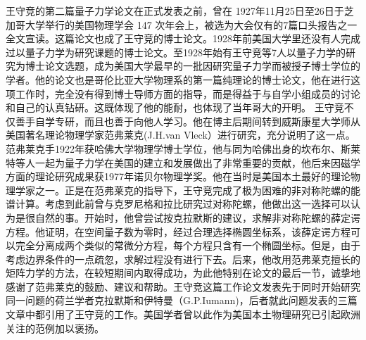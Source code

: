 王守竞的第二篇量子力学论文在正式发表之前，曾在 1927年11月25日至26日于芝加哥大学举行的美国物理学会 147 次年会上，被选为大会仅有的7篇口头报告之一全文宣读。这篇论文也成了王守竞的博士论文。1928年前美国大学里还没有人完成过以量子力学为研究课题的博士论文。至1928年始有王守竞等7人以量子力学的研究为博士论文选题，成为美国大学最早的一批因研究量子力学而被授子博士学位的学者。他的论文也是哥伦比亚大学物理系的第一篇纯理论的博士论文，他在进行这项工作时，完全没有得到博士导师方面的指导，而是得益于与自学小组成员的讨论和自己的认真钻研。这既体现了他的能耐，也体现了当年哥大的开明。
王守竞不仅善手自学专研，而且也善于向他人学习。他在博主后期间转到威斯康星大学师从美国著名理论物理学家范弗莱克(J.H.van Vleck）进行研究，充分说明了这一点。范弗莱克手1922年获哈佛大学物理学博士学位，他与同为哈佛出身的坎布尔、斯莱特等人一起为量子力学在美国的建立和发展做出了非常重要的贡献，他后来因磁学方面的理论研究成果获1977年诺贝尔物理学奖。他在当时是美国本土最好的理论物理学家之一。正是在范弗莱克的指导下，王守竞完成了极为困难的非对称陀螺的能谱计算。考虑到此前曾与克罗尼格和拉比研究过对称陀螺，他做出这一选择可以认为是很自然的事。开始时，他曾尝试按克拉默斯的建议，求解非对称陀螺的薛定谔方程。他证明，在空间量子数为零时，经过合理选择椭圆坐标系，该薛定谔方程可以完全分离成两个类似的常微分方程，每个方程只含有一个椭圆坐标。但是，由于考虑边界条件的一点疏忽，求解过程没有进行下去。后来，他改用范弗莱克擅长的矩阵力学的方法，在较短期间内取得成功，为此他特别在论文的最后一节，诚挚地感谢了范弗莱克的鼓励、建议和帮助。王守竞这篇工作论文发表先于同时开始研究同一问题的荷兰学者克拉默斯和伊特曼（G.P.Iumann)，后者就此问题发表的三篇文章中都引用了王守竞的工作。美国学者曾以此作为美国本土物理研究已引起欧洲关注的范例加以褒扬。

